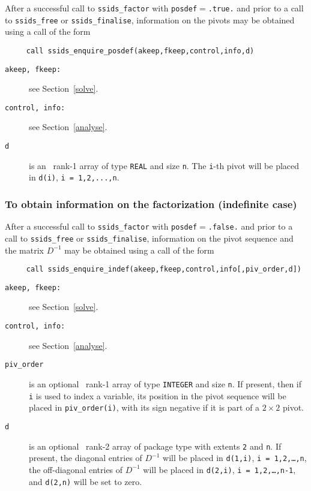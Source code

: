 \documentclass{spral}
\begin{document}
After a successful call to {\tt ssids\_factor}
with {\tt posdef}$=${\tt .true.} and prior to
a call to {\tt ssids\_free} or {\tt ssids\_finalise}, information on the
pivots may be obtained using a call of the form
\begin{verbatim}
     call ssids_enquire_posdef(akeep,fkeep,control,info,d)
\end{verbatim}

\vspace*{-3mm}
\begin{description}


\item[\texttt{akeep{\rm ,} fkeep{\rm :}}] see Section~\ref{solve}.

\item[\texttt{control{\rm ,} info{\rm :}}] see Section~\ref{analyse}.

\item[\texttt{d}] is an  \intentout\ rank-1 array of type {\tt  REAL} and
size {\tt n}.
The {\tt i}-th pivot will be placed in {\tt d(i)},
{\tt i = 1,2,...,n}.

\end{description}

\subsubsection{To obtain information on the factorization (indefinite case)}

After a successful call to {\tt ssids\_factor}
with {\tt posdef}$=${\tt .false.} and prior to
a call to {\tt ssids\_free} or {\tt ssids\_finalise}, information on the
pivot sequence and the matrix ${D}^{-1}$
may be obtained using a call of the form
\begin{verbatim}
     call ssids_enquire_indef(akeep,fkeep,control,info[,piv_order,d])
\end{verbatim}

\vspace*{-3mm}
\begin{description}

\item[\texttt{akeep{\rm ,} fkeep{\rm :}}]  see Section~\ref{solve}.

\item[\texttt{control{\rm ,} info{\rm :}}]  see Section~\ref{analyse}.

\item[\texttt{piv\_order}] is an optional \intentout\ rank-1 array of type {\tt INTEGER}
and size {\tt n}. If present, then if {\tt i} is used to
index a variable,
its position in the pivot sequence will
be placed in {\tt piv\_order(i)}, with its sign negative if it is
part of a $2 \times 2$ pivot.

\item[\texttt{d}] is an optional \intentout\ rank-2 array of package type with
extents {\tt 2} and {\tt n}.
If present, the diagonal entries of ${D}^{-1}$ will be placed
in {\tt d(1,i)}, {\tt i = 1,2,\ldots,n},
the off-diagonal entries  of ${D}^{-1}$ will be placed in
{\tt d(2,i)}, {\tt i = 1,2,\ldots,n-1}, and
{\tt d(2,n)} will be set to zero.

\end{description}
\end{document}
